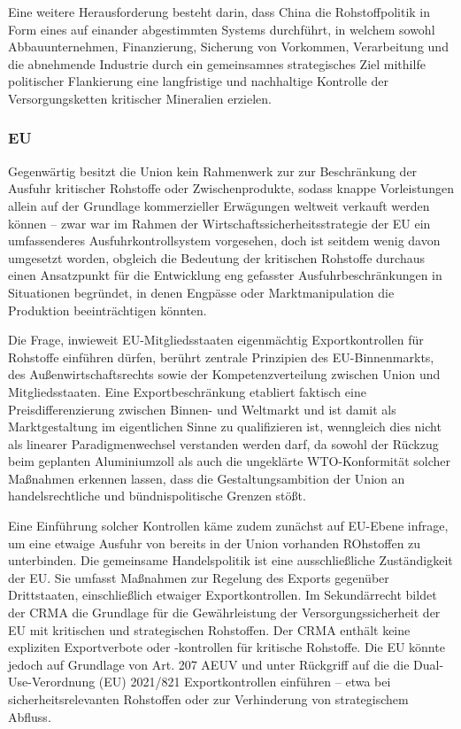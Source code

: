 \documentclass[12pt,a4paper,oneside]{book} %
\begin{document}
Eine weitere Herausforderung besteht darin, dass China die Rohstoffpolitik in Form eines auf einander abgestimmten Systems durchführt, in welchem sowohl Abbauunternehmen, Finanzierung, Sicherung von Vorkommen, Verarbeitung und die abnehmende Industrie durch ein gemeinsamnes strategisches Ziel mithilfe politischer Flankierung eine langfristige und nachhaltige Kontrolle der Versorgungsketten kritischer Mineralien erzielen.

\subsubsection{EU}
Gegenwärtig besitzt die Union kein Rahmenwerk zur  zur Beschränkung der Ausfuhr kritischer Rohstoffe oder Zwischenprodukte, sodass knappe Vorleistungen allein auf der Grundlage kommerzieller Erwägungen weltweit verkauft werden können -- zwar war im Rahmen der Wirtschaftssicherheitsstrategie der EU ein umfassenderes Ausfuhrkontrollsystem vorgesehen, doch ist seitdem wenig davon umgesetzt worden, obgleich die Bedeutung der kritischen Rohstoffe durchaus einen Ansatzpunkt für die Entwicklung eng gefasster Ausfuhrbeschränkungen in Situationen begründet, in denen Engpässe oder Marktmanipulation die Produktion beeinträchtigen könnten.\autocite{The EU's critical raw materials predicament: ReSourceEU to the Rescue?}

Die Frage, inwieweit EU-Mitgliedsstaaten eigenmächtig Exportkontrollen für Rohstoffe einführen dürfen, berührt zentrale Prinzipien des EU-Binnenmarkts, des Außenwirtschaftsrechts sowie der Kompetenzverteilung zwischen Union und Mitgliedsstaaten. Eine Exportbeschränkung etabliert faktisch eine Preisdifferenzierung zwischen Binnen- und Weltmarkt und ist damit als Marktgestaltung im eigentlichen Sinne zu qualifizieren ist, wenngleich dies nicht als linearer Paradigmenwechsel verstanden werden darf, da sowohl der Rückzug beim geplanten Aluminiumzoll als auch die ungeklärte WTO-Konformität solcher Maßnahmen erkennen lassen, dass die Gestaltungsambition der Union an handelsrechtliche und bündnispolitische Grenzen stößt.

Eine Einführung solcher Kontrollen käme zudem zunächst auf EU-Ebene infrage, um eine etwaige Ausfuhr von bereits in der Union vorhanden ROhstoffen zu unterbinden. Die gemeinsame Handelspolitik ist eine ausschließliche Zuständigkeit der EU. Sie umfasst Maßnahmen zur Regelung des Exports gegenüber Drittstaaten, einschließlich etwaiger Exportkontrollen. Im Sekundärrecht bildet der CRMA die Grundlage für die Gewährleistung der Versorgungssicherheit der EU mit kritischen und strategischen Rohstoffen. Der CRMA enthält keine expliziten Exportverbote oder -kontrollen für kritische Rohstoffe. Die EU könnte jedoch auf Grundlage von Art. 207 AEUV und unter Rückgriff auf die die Dual-Use-Verordnung (EU) 2021/821 Exportkontrollen einführen – etwa bei sicherheitsrelevanten Rohstoffen oder zur Verhinderung von strategischem Abfluss.
\end{document}
